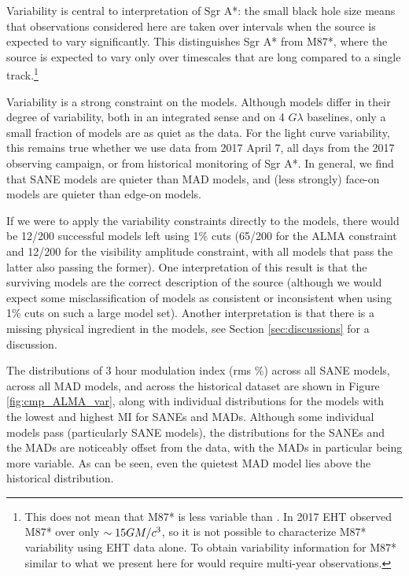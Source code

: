 Variability is central to interpretation of Sgr A*: the small black hole size means that observations considered here are taken over intervals when the source is expected to vary significantly.  This distinguishes Sgr A* from M87*, where the source is expected to vary only over timescales that are long compared to a single track.\footnote{This does not mean that M87* is less variable than \sgra.  In 2017 EHT observed M87* over only $\sim 15GM/c^3$, so it is not possible to characterize M87* variability using EHT data alone.  To obtain variability information for M87* similar to what we present here for \sgra would require multi-year observations.}

Variability is a strong constraint on the models.  Although models differ in their degree of variability, both in an integrated sense and on 4 $G\lambda$ baselines, only a small fraction of models are as quiet as the data.  For the light curve variability, this remains true whether we use data from 2017 April 7, all days from the 2017 observing campaign, or from historical monitoring of Sgr A*.   In general, we find that SANE models are quieter than MAD models, and (less strongly) face-on models are quieter than edge-on models.

If we were to apply the variability constraints directly to the models, there would be 12/200 successful models left using 1\% cuts (65/200 for the ALMA constraint and 12/200 for the visibility amplitude constraint, with all models that pass the latter also passing the former).  One interpretation of this result is that the surviving models are the correct description of the source (although we would expect some misclassification of models as consistent or inconsistent when using 1\% cuts on such a large model set).  Another interpretation is that there is a missing physical ingredient in the models, see Section \ref{sec:discussions} for a discussion.


The distributions of 3 hour modulation index (rms \%) across all SANE models, across all MAD models, and across the historical dataset are shown in Figure \ref{fig:cmp_ALMA_var}, along with individual distributions for the models with the lowest and highest MI for SANEs and MADs. Although some individual models  pass (particularly SANE models), the distributions for the SANEs and the MADs are noticeably offset from the data, with the MADs in particular being more variable. As can be seen, even the quietest MAD model lies above the historical distribution. 

